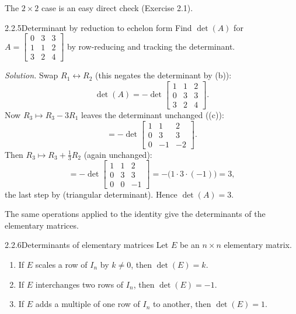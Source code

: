 \begin{proofomit}[MTH2025]The $2\times2$ case is an easy direct check (Exercise 2.1).
\end{proofomit}

\begin{exmp}{2.2.5}{Determinant by reduction to echelon form}
Find $\det(A)$ for $A=\left[\begin{smallmatrix}0&3&3\\1&1&2\\3&2&4\end{smallmatrix}\right]$ by row-reducing and tracking the determinant.

\smallskip
\noindent\textit{Solution.} Swap $R_1\leftrightarrow R_2$ (this negates the determinant by (b)):
\[
\det(A)=-\det\!\begin{bmatrix}1&1&2\\0&3&3\\3&2&4\end{bmatrix}.
\]
Now $R_3\mapsto R_3-3R_1$ leaves the determinant unchanged ((c)):
\[
=-\det\!\begin{bmatrix}1&1&2\\0&3&3\\0&-1&-2\end{bmatrix}.
\]
Then $R_3\mapsto R_3+\tfrac13R_2$ (again unchanged):
\[
=-\det\!\begin{bmatrix}1&1&2\\0&3&3\\0&0&-1\end{bmatrix}=-\bigl(1\cdot3\cdot(-1)\bigr)=3,
\]
the last step by  (triangular determinant). Hence $\det(A)=3$.
\end{exmp}

The same operations applied to the identity give the determinants of the elementary matrices.

\begin{thms}{2.2.6}{Determinants of elementary matrices}
Let $E$ be an $n\times n$ elementary matrix.
\begin{enumerate}[label=\textup{(\alph*)},leftmargin=2.2em,itemsep=1pt]
\item If $E$ scales a row of $I_n$ by $k\neq0$, then $\det(E)=k$.
\item If $E$ interchanges two rows of $I_n$, then $\det(E)=-1$.
\item If $E$ adds a multiple of one row of $I_n$ to another, then $\det(E)=1$.
\end{enumerate}
\end{thms}


